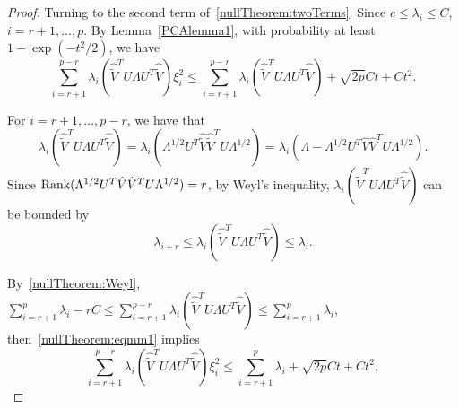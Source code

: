 \begin{proof}



  Turning to the second term of~\eqref{nullTheorem:twoTerms}.
Since $c\leq \lambda_i\leq C$, $i=r+1,\ldots,p$. By Lemma~\ref{PCAlemma1}, with probability at least $1-\exp(-t^2/2)$, we have
    \begin{equation}\label{nullTheorem:eqmm1}
    \sum_{i=r+1}^{p-r} \lambda_i (\hat{\tilde{V}}^T U \Lambda U^T \hat{\tilde{V}}) \xi_i^2
    \leq \sum_{i=r+1}^{p-r} \lambda_i (\hat{\tilde{V}}^T U \Lambda U^T \hat{\tilde{V}}) +\sqrt{2p}Ct + Ct^2.
    \end{equation}
  
  For $i= r+1,\ldots,p-r$, we have that
    $$
    \lambda_i(\hat{\tilde{V}}^T U\Lambda U^T \hat{\tilde{V}})
    =
    \lambda_i(\Lambda^{1/2} U^T \hat{\tilde{V}}\hat{\tilde{V}}^T U\Lambda^{1/2})
    =
    \lambda_i(\Lambda-\Lambda^{1/2} U^T\hat{V}\hat{V}^T U\Lambda^{1/2}).
    $$
    Since $\operatorname{Rank}(\Lambda^{1/2} U^T\hat{V}\hat{V}^T U\Lambda^{1/2})=r$, by Weyl's inequality, $\lambda_i(\hat{\tilde{V}}^T U\Lambda U^T \hat{\tilde{V}})$ can be bounded by
    \begin{equation}\label{nullTheorem:Weyl}
    \lambda_{i+r}
    \leq \lambda_i(\hat{\tilde{V}}^T U\Lambda U^T \hat{\tilde{V}})\leq \lambda_i.
    \end{equation}

By~\eqref{nullTheorem:Weyl}, $\sum_{i=r+1}^p \lambda_i -rC\leq \sum_{i=r+1}^{p-r} \lambda_i (\hat{\tilde{V}}^T U \Lambda U^T \hat{\tilde{V}})\leq \sum_{i=r+1}^p \lambda_i$, then~\eqref{nullTheorem:eqmm1} implies
    \begin{equation}\label{nullTheorem:eqmm}
    \sum_{i=r+1}^{p-r} \lambda_i (\hat{\tilde{V}}^T U \Lambda U^T \hat{\tilde{V}}) \xi_i^2
    \leq \sum_{i=r+1}^p \lambda_i+\sqrt{2p}Ct + Ct^2,
    \end{equation}




\end{proof}
